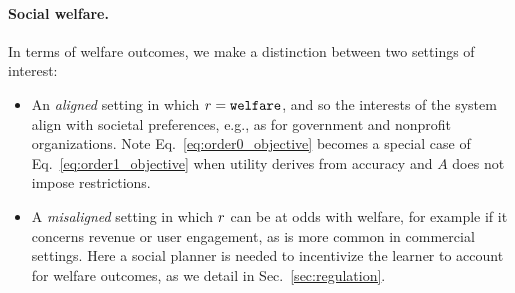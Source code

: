 

\paragraph{Social welfare.}
In terms of welfare outcomes,
we make a distinction between two settings of interest:
\begin{itemize}[leftmargin=1em,topsep=0em,itemsep=0.2em]
\item
An \emph{aligned} setting in which ${r}={\mathtt{welfare}}$,
and so the interests of the system align with societal preferences,
e.g., as for government and nonprofit organizations. %
Note Eq.~\eqref{eq:order0_objective} becomes a special case of
Eq.~\eqref{eq:order1_objective} when utility derives from accuracy
and $A$ does not impose restrictions. 

\item
A \emph{misaligned} setting in which ${r}$ can be at odds with welfare,
for example if it concerns revenue or user engagement,
as is more common in commercial settings.
Here a social planner is needed to incentivize the learner to account for welfare outcomes, as we detail in Sec.~\ref{sec:regulation}.
\end{itemize}










